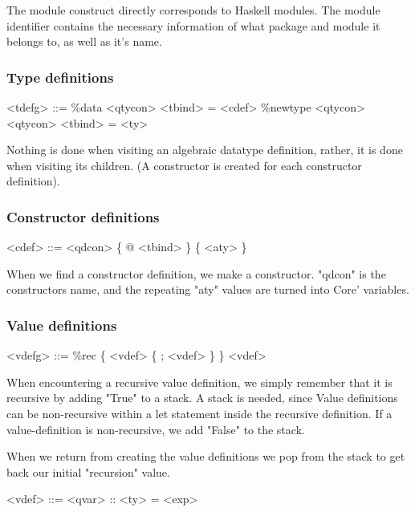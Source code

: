 The module construct directly corresponds to Haskell modules. The module identifier
contains the necessary information of what package and module it belongs to, as
well as it's name.

\subsubsection{Type definitions}

\begin{grammar}
<tdefg> ::= \%data <qtycon> <tbind> = <cdef>
       \alt \%newtype <qtycon> <qtycon> <tbind> = <ty>
\end{grammar}

Nothing is done when visiting an algebraic datatype definition, rather, it is done when 
visiting its children. (A constructor is created for each constructor definition).

\subsubsection{Constructor definitions}

\begin{grammar}
<cdef> ::= <qdcon> \{ @ <tbind> \} \{ <aty> \}
\end{grammar}

When we find a constructor definition, we make a constructor. "qdcon" is the 
constructors name, and the repeating "aty" values are turned into Core' variables.

\subsubsection{Value definitions}

\begin{grammar}
<vdefg> ::= \%rec \{ <vdef> \{ ; <vdef> \} \}
       \alt <vdef>
\end{grammar}

When encountering a recursive value definition, we simply remember that it is
recursive by adding "True" to a stack. A stack is needed, since Value definitions
can be non-recursive within a let statement inside the recursive definition. If
a value-definition is non-recursive, we add "False" to the stack.

When we return from creating the value definitions we pop from the stack to get
back our initial "recursion" value.

\begin{grammar}
<vdef> ::= <qvar> :: <ty> = <exp>
\end{grammar}

